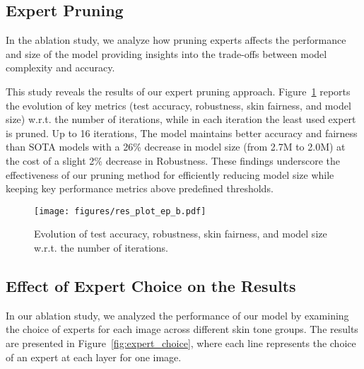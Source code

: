 
\subsection{Expert Pruning}

In the ablation study, we analyze how pruning experts affects the performance and size of the model providing insights into the trade-offs between model complexity and accuracy. %





This study reveals the results of our expert pruning approach. Figure~\ref{fig:res_plot_ep_b} reports the evolution of key metrics (test accuracy, robustness, skin fairness, and model size) w.r.t. the number of iterations, while in each iteration the least used expert is pruned. Up to 16 iterations, The model maintains better accuracy and fairness than SOTA models with a 26\% decrease in model size (from 2.7M to 2.0M) at the cost of a slight 2\% decrease in Robustness. These findings underscore the effectiveness of our pruning method for efficiently reducing model size while keeping key performance metrics above predefined thresholds.

\begin{figure}[!ht]
\centering
    \texttt{[image: figures/res\_plot\_ep\_b.pdf]}
        \caption{Evolution of test accuracy, robustness, skin fairness, and model size w.r.t. the number of iterations.}
        \label{fig:res_plot_ep_b}
\end{figure}

\subsection{Effect of Expert Choice on the Results}
\label{app:expert}
In our ablation study, we analyzed the performance of our model by examining the choice of experts for each image across different skin tone groups. The results are presented in Figure~\ref{fig:expert_choice}, where each line represents the choice of an expert at each layer for one image.

